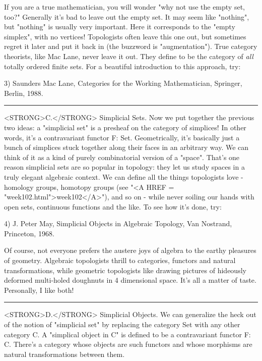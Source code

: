 If you are a true mathematician, you will wonder "why not use the empty
set, too?"  Generally it's bad to leave out the empty set.  It may seem
like "nothing", but "nothing" is usually very important.  Here it
corresponds to the "empty simplex", with no vertices!  Topologists often
leave this one out, but sometimes regret it later and put it back in
(the buzzword is "augmentation").  True category theorists, like Mac
Lane, never leave it out.  They define \Delta  to be the category of \emph{all}
totally ordered finite sets.  For a beautiful introduction to this
approach, try:

3) Saunders Mac Lane, Categories for the Working Mathematician,
Springer, Berlin, 1988.
\par\noindent\rule{\textwidth}{0.4pt}
<STRONG>C.</STRONG>  Simplicial Sets.  Now we put together the previous two ideas: a
"simplicial set" is a presheaf on the category of simplices!  In other
words, it's a contravariant functor F: \Delta  \to  Set.  Geometrically,
it's basically just a bunch of simplices stuck together along their
faces in an arbitrary way.  We can think of it as a kind of purely
combinatorial version of a "space".  That's one reason simplicial sets
are so popular in topology: they let us study spaces in a truly elegant
algebraic context.  We can define all the things topologists love -
homology groups, homotopy groups (see "<A HREF = "week102.html">week102</A>"), and so on - while
never soiling our hands with open sets, continuous functions and the
like.  To see how it's done, try:

4) J. Peter May, Simplicial Objects in Algebraic Topology, Van Nostrand,
Princeton, 1968.

Of course, not everyone prefers the austere joys of algebra to the
earthy pleasures of geometry.  Algebraic topologists thrill to
categories, functors and natural transformations, while geometric
topologists like drawing pictures of hideously deformed multi-holed
doughnuts in 4 dimensional space.  It's all a matter of taste.
Personally, I like both!

\par\noindent\rule{\textwidth}{0.4pt}
<STRONG>D.</STRONG>
  Simplicial Objects.  We can generalize the heck out of the notion of
"simplicial set" by replacing the category Set with any other category
C.  A "simplical object in C" is defined to be a contravariant functor
F: \Delta  \to  C.  There's a category whose objects are such functors and
whose morphisms are natural transformations between them.

